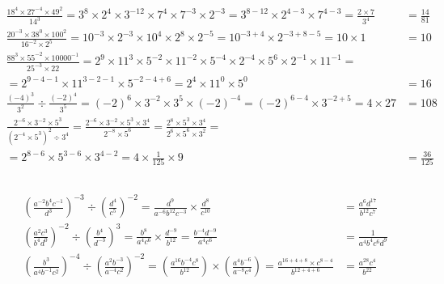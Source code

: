 \documentclass[a4paper,12pt]{article}
\begin{document}
\subsection{} %

\begin{align*}
\frac{18^4 \times 27^{-4} \times 49^2}{14^3} 
= 3^8 \times 2^4 \times 3^{-12} \times 7^4 \times 7^{-3} \times 2^{-3} 
= 3^{8 - 12} \times 2^{4 - 3} \times 7^{4 - 3} 
= \frac{2 \times 7}{3^4} 
&= \frac{14}{81} \\[6pt]
\frac{20^{-3} \times 38^0 \times 100^2}{16^{-2} \times 2^5} 
= 10^{-3} \times 2^{-3} \times 10^4 \times 2^8 \times 2^{-5} 
= 10^{-3 + 4} \times 2^{-3 + 8 - 5} 
= 10 \times 1 
&= 10 \\[6pt]
\frac{88^3 \times 55^{-2} \times 10000^{-1}}{25^{-3} \times 22} 
= 2^9 \times 11^3 \times 5^{-2} \times 11^{-2} \times 5^{-4} \times 2^{-4} \times 5^6 \times 2^{-1} \times 11^{-1} = \\[6pt]
= 2^{9 - 4 - 1} \times 11^{3 - 2 - 1} \times 5^{-2 - 4 + 6}
= 2^4 \times 11^0 \times 5^0
&= 16 \\[6pt]
\frac{(-4)^3}{3^2} \div \frac{(-2)^4}{3^5}
= (-2)^6 \times 3^{-2} \times 3^5 \times (-2)^{-4}
= (-2)^{6 - 4} \times 3^{-2 + 5} 
= 4 \times 27
&= 108  \\[6pt]
\frac{2^{-6} \times 3^{-2} \times 5^3}{(2^{-4} \times 5^3)^2 \div 3^4}
= \frac{2^{-6} \times 3^{-2} \times 5^3 \times 3^4}{2^{-8} \times 5^6}
= \frac{2^8 \times 5^3 \times 3^4}{2^6 \times 5^6 \times 3^2} = \\[6pt]
= 2^{8 - 6} \times 5^{3 - 6} \times 3^{4 - 2}
= 4 \times \frac{1}{125} \times 9
&= \frac{36}{125}
\end{align*}

\subsection{} %

\begin{align*}
\left( \frac{a^{-2}b^4c^{-1}}{d^3} \right)^{-3} \div \left( \frac{d^4}{c^5} \right)^{-2} 
= \frac{d^9}{a^{-6}b^{12}c^{-3}} \times \frac{d^8}{c^{10}}
&= \frac{a^6 d^{17}}{b^{12} c^7} \\[6pt]
\left( \frac{a^2 c^3}{b^4 d^0} \right)^{-2} \div \left( \frac{b^4}{d^{-3}} \right)^3
= \frac{b^8}{a^4 c^6} \times \frac{d^{-9}}{b^{12}}
= \frac{b^{-4} d^{-9}}{a^4 c^6}
&= \frac{1}{a^4 b^4 c^6 d^9} \\[6pt]
\left( \frac{b^3}{a^4b^{-1}c^2} \right)^{-4} \div \left( \frac{a^2b^{-3}}{a^{-4}c^2} \right)^{-2}
= \left( \frac{a^{16}b^{-4}c^8}{b^{12}} \right) \times \left( \frac{a^4b^{-6}}{a^{-8}c^4} \right)
= \frac{a^{16 + 4 + 8} \times c^{8 - 4}}{b^{12 + 4 + 6}}
&= \frac{a^{28}c^4}{b^{22}}
\end{align*}
\end{document}
